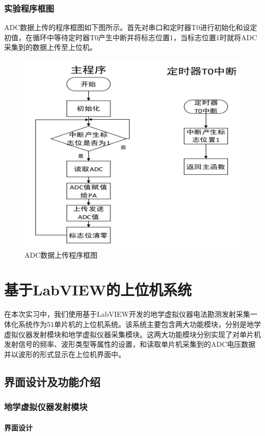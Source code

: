 \documentclass[UTF8]{article}
\begin{document}
\subsubsection{实验程序框图}
ADC数据上传的程序框图如下图所示。首先对串口和定时器T0进行初始化和设定初值，在循环中等待定时器T0产生中断并将标志位置1，当标志位置1时就将ADC采集到的数据上传至上位机。
\begin{figure}[H]
    \centering %
    \includegraphics[width=.6\textwidth]{figure/ADC数据上传-程序框图.png} 
    \caption{ADC数据上传程序框图} %
\end{figure}

%
\section{基于LabVIEW的上位机系统}
在本次实习中，我们使用基于LabVIEW开发的地学虚拟仪器电法勘测发射采集一体化系统作为51单片机的上位机系统。该系统主要包含两大功能模块，分别是地学虚拟仪器发射模块和地学虚拟仪器采集模块。这两大功能模块分别实现了对单片机发射信号的频率、波形类型等属性的设置，和读取单片机采集到的ADC电压数据并以波形的形式显示在上位机界面中。

\subsection{界面设计及功能介绍}
\subsubsection{地学虚拟仪器发射模块}
\paragraph{界面设计}~{}
\end{document}
